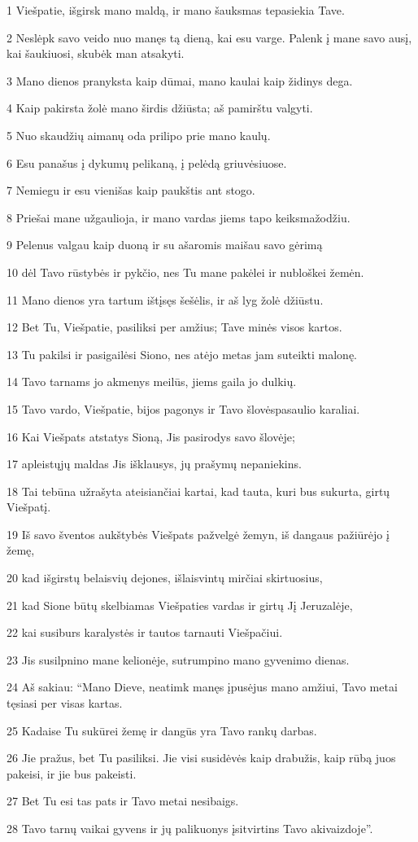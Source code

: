 \par 1 Viešpatie, išgirsk mano maldą, ir mano šauksmas tepasiekia Tave. 
\par 2 Neslėpk savo veido nuo manęs tą dieną, kai esu varge. Palenk į mane savo ausį, kai šaukiuosi, skubėk man atsakyti. 
\par 3 Mano dienos pranyksta kaip dūmai, mano kaulai kaip židinys dega. 
\par 4 Kaip pakirsta žolė mano širdis džiūsta; aš pamirštu valgyti. 
\par 5 Nuo skaudžių aimanų oda prilipo prie mano kaulų. 
\par 6 Esu panašus į dykumų pelikaną, į pelėdą griuvėsiuose. 
\par 7 Nemiegu ir esu vienišas kaip paukštis ant stogo. 
\par 8 Priešai mane užgaulioja, ir mano vardas jiems tapo keiksmažodžiu. 
\par 9 Pelenus valgau kaip duoną ir su ašaromis maišau savo gėrimą 
\par 10 dėl Tavo rūstybės ir pykčio, nes Tu mane pakėlei ir nubloškei žemėn. 
\par 11 Mano dienos yra tartum ištįsęs šešėlis, ir aš lyg žolė džiūstu. 
\par 12 Bet Tu, Viešpatie, pasiliksi per amžius; Tave minės visos kartos. 
\par 13 Tu pakilsi ir pasigailėsi Siono, nes atėjo metas jam suteikti malonę. 
\par 14 Tavo tarnams jo akmenys meilūs, jiems gaila jo dulkių. 
\par 15 Tavo vardo, Viešpatie, bijos pagonys ir Tavo šlovės­pasaulio karaliai. 
\par 16 Kai Viešpats atstatys Sioną, Jis pasirodys savo šlovėje; 
\par 17 apleistųjų maldas Jis išklausys, jų prašymų nepaniekins. 
\par 18 Tai tebūna užrašyta ateisiančiai kartai, kad tauta, kuri bus sukurta, girtų Viešpatį. 
\par 19 Iš savo šventos aukštybės Viešpats pažvelgė žemyn, iš dangaus pažiūrėjo į žemę, 
\par 20 kad išgirstų belaisvių dejones, išlaisvintų mirčiai skirtuosius, 
\par 21 kad Sione būtų skelbiamas Viešpaties vardas ir girtų Jį Jeruzalėje, 
\par 22 kai susiburs karalystės ir tautos tarnauti Viešpačiui. 
\par 23 Jis susilpnino mane kelionėje, sutrumpino mano gyvenimo dienas. 
\par 24 Aš sakiau: “Mano Dieve, neatimk manęs įpusėjus mano amžiui, Tavo metai tęsiasi per visas kartas. 
\par 25 Kadaise Tu sukūrei žemę ir dangūs yra Tavo rankų darbas. 
\par 26 Jie pražus, bet Tu pasiliksi. Jie visi susidėvės kaip drabužis, kaip rūbą juos pakeisi, ir jie bus pakeisti. 
\par 27 Bet Tu esi tas pats ir Tavo metai nesibaigs. 
\par 28 Tavo tarnų vaikai gyvens ir jų palikuonys įsitvirtins Tavo akivaizdoje”.


